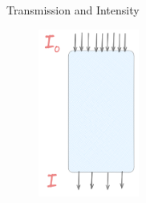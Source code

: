 \documentclass[aspectratio=169,xcolor=dvipsnames]{beamer}
\begin{document}
\begin{frame}{Transmission and Intensity}
      \begin{figure}[h!]
    \centering
    \includegraphics[width=0.295\textwidth]{intensity.png}
  \end{figure}
\end{frame}
\end{document}
